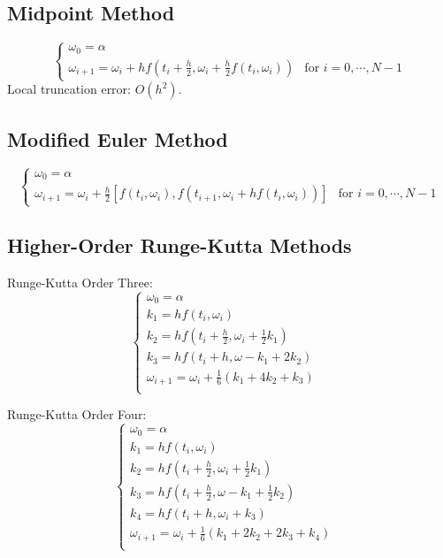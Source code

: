 \subsection{Midpoint Method}
\begin{equation*}
  \begin{cases}
    \omega_0=\alpha & \\
    \omega_{i+1}=\omega_i+hf\left(t_i+\frac{h}{2},\omega_i+\frac{h}{2}f(t_i,\omega_i)\right) & \text{for $i=0,\cdots,N-1$}
  \end{cases}
\end{equation*}
Local truncation error: $O(h^2)$.

\subsection{Modified Euler Method} \begin{equation*}
  \begin{cases}
    \omega_0=\alpha & \\
    \omega_{i+1}=\omega_i+\frac{h}{2}\left[f(t_i,\omega_i),f\left(t_{i+1},\omega_i+hf(t_i,\omega_i)\right)\right] & \text{for $i=0,\cdots,N-1$}
  \end{cases}
\end{equation*}

\subsection{Higher-Order Runge-Kutta Methods}
Runge-Kutta Order Three:
\begin{equation*}
  \begin{cases}
    \omega_0=\alpha &\\
    k_1=hf(t_i,\omega_i) &\\
    k_2=hf(t_i+\frac{h}{2},\omega_i+\frac{1}{2}k_1) &\\
    k_3=hf(t_i+h,\omega-k_1+2k_2) &\\
    \omega_{i+1}=\omega_i+\frac{1}{6}(k_1+4k_2+k_3) &\\
  \end{cases}
\end{equation*}

Runge-Kutta Order Four:
\begin{equation*}
  \begin{cases}
    \omega_0=\alpha &\\
    k_1=hf(t_i,\omega_i) &\\
    k_2=hf(t_i+\frac{h}{2},\omega_i+\frac{1}{2}k_1) &\\
    k_3=hf(t_i+\frac{h}{2},\omega-k_1+\frac{1}{2}k_2) &\\
    k_4=hf(t_i+h,\omega_i+k_3) &\\
    \omega_{i+1}=\omega_i+\frac{1}{6}(k_1+2k_2+2k_3+k_4) &\\
  \end{cases}
\end{equation*}

